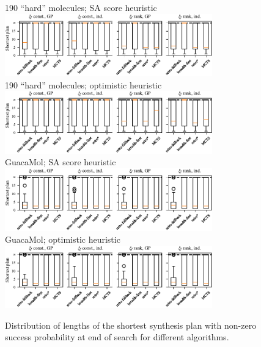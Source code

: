 \begin{figure}[htb]
    \centering
    {190 ``hard'' molecules; SA score heuristic} \\
    \vspace{0.3cm}
    \includegraphics[width=0.8\textwidth]{figures/comparison/retrostar190/shortest_sascore.pdf} \\
    \vspace{0.3cm}
    {190 ``hard'' molecules; optimistic heuristic} \\
    \vspace{0.3cm}
    \includegraphics[width=0.8\textwidth]{figures/comparison/retrostar190/shortest_optimistic.pdf} \\
    \vspace{0.3cm}
    {GuacaMol; SA score heuristic} \\
    \vspace{0.3cm}
    \includegraphics[width=0.8\textwidth]{figures/comparison/guacamol/shortest_sascore.pdf} \\
    \vspace{0.3cm}
    {GuacaMol; optimistic heuristic} \\
    \vspace{0.3cm}
    \includegraphics[width=0.8\textwidth]{figures/comparison/guacamol/shortest_optimistic.pdf}
    \caption[Length of shortest synthesis plan.]{
        Distribution of lengths of the shortest synthesis plan
        with non-zero success probability
        at end of search
        for different algorithms.
    }
    \label{fig:shortest-route}
\end{figure}
